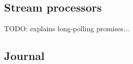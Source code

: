 \subsection{Stream processors}




TODO: explains long-polling promises...

\subsection{Journal}



